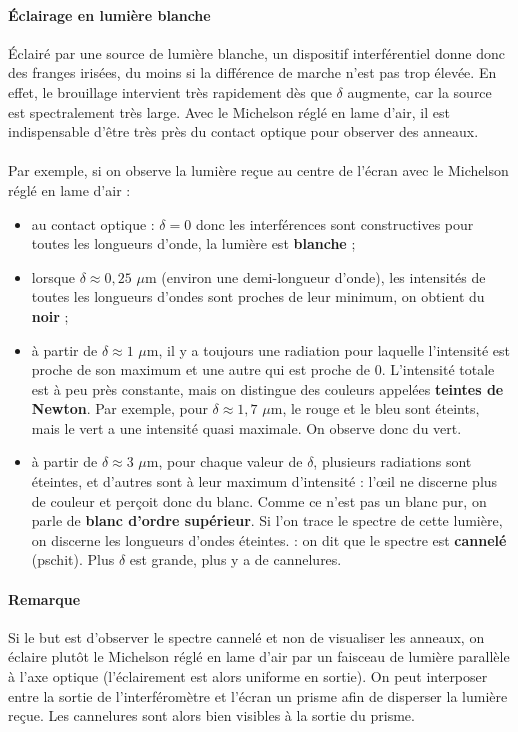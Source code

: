 \documentclass[french]{book}
\theoremstyle{plain}
\theoremstyle{definition}
\theoremstyle{remark}
\begin{document}
\paragraph{Éclairage en lumière blanche}
Éclairé par une source de lumière blanche, un dispositif interférentiel donne donc des franges irisées, du moins si la différence de marche n'est pas trop élevée. En effet, le brouillage intervient très rapidement dès que $\delta$ augmente, car la source est spectralement très large. Avec le Michelson réglé en lame d'air, il est indispensable d'être très près du contact optique pour observer des anneaux. \\ \\ Par exemple, si on observe la lumière reçue au centre de l'écran avec le Michelson réglé en lame d'air :
\begin{itemize}
	\item au contact optique : $\delta=0$ donc les interférences sont constructives pour toutes les longueurs d'onde, la lumière est \textbf{blanche} ;
	\item lorsque $\delta\approx0,25$ $\mu$m (environ une demi-longueur d'onde), les intensités de toutes les longueurs d'ondes sont proches de leur minimum, on obtient du \textbf{noir} ;
	\item à partir de $\delta\approx 1$ $\mu$m, il y a toujours une radiation pour laquelle l'intensité est proche de son maximum et une autre qui est proche de $0$. L'intensité totale est à peu près constante, mais on distingue des couleurs appelées \textbf{teintes de Newton}. Par exemple, pour $\delta\approx 1,7$ $\mu$m, le rouge et le bleu sont éteints, mais le vert a une intensité quasi maximale. On observe donc du vert.
	\item à partir de $\delta\approx 3$ $\mu$m, pour chaque valeur de $\delta$, plusieurs radiations sont éteintes, et d'autres sont à leur maximum d'intensité : l'œil ne discerne plus de couleur et perçoit donc du blanc. Comme ce n'est pas un blanc pur, on parle de \textbf{blanc d'ordre supérieur}. Si l'on trace le spectre de cette lumière, on discerne les longueurs d'ondes éteintes. : on dit que le spectre est \textbf{cannelé} (pschit). Plus $\delta$ est grande, plus y a de cannelures.
\end{itemize}
\paragraph{Remarque} Si le but est d'observer le spectre cannelé et non de visualiser les anneaux, on éclaire plutôt le Michelson réglé en lame d'air par un faisceau de lumière parallèle à l'axe optique (l'éclairement est alors uniforme en sortie). On peut interposer entre la sortie de l'interféromètre et l'écran un prisme afin de disperser la lumière reçue. Les cannelures sont alors bien visibles à la sortie du prisme.
\end{document}
